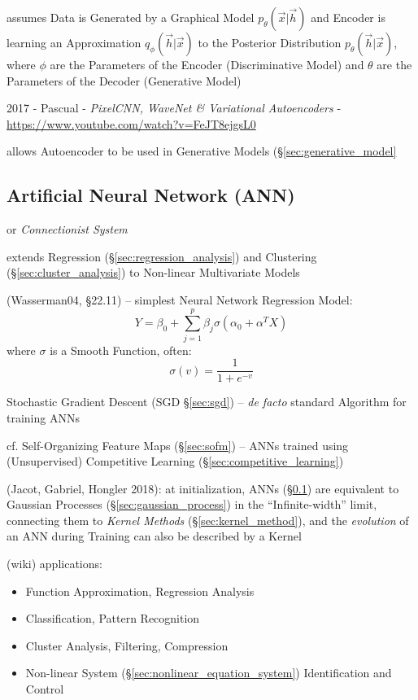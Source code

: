 assumes Data is Generated by a Graphical Model $p_\theta(\vec{x} | \vec{h})$ and
Encoder is learning an Approximation $q_\phi(\vec{h} | \vec{x})$ to the
Posterior Distribution $p_\theta(\vec{h} | \vec{x})$, where $\phi$ are the
Parameters of the Encoder (Discriminative Model) and $\theta$ are the Parameters
of the Decoder (Generative Model)

2017 - Pascual - \emph{PixelCNN, WaveNet \& Variational Autoencoders} -
\url{https://www.youtube.com/watch?v=FeJT8ejgsL0}

allows Autoencoder to be used in Generative Models (\S\ref{sec:generative_model}



\subsection{Artificial Neural Network (ANN)}\label{sec:ann}


or \emph{Connectionist System}

extends Regression (\S\ref{sec:regression_analysis}) and Clustering
(\S\ref{sec:cluster_analysis}) to Non-linear Multivariate Models

(Wasserman04, \S22.11) --
simplest Neural Network Regression Model:
\[
  Y = \beta_0 + \sum_{j=1}^p \beta_j \sigma (\alpha_0 + \alpha^T X)
\]
where $\sigma$ is a Smooth Function, often:
\[
  \sigma(v) = \frac{1}{1 + e^{-v}}
\]

Stochastic Gradient Descent (SGD \S\ref{sec:sgd}) -- \emph{de facto} standard
Algorithm for training ANNs

\fist cf. Self-Organizing Feature Maps (\S\ref{sec:sofm}) -- ANNs trained using
(Unsupervised) Competitive Learning (\S\ref{sec:competitive_learning})

(Jacot, Gabriel, Hongler 2018): at initialization, ANNs (\S\ref{sec:ann}) are
equivalent to Gaussian Processes (\S\ref{sec:gaussian_process}) in the
``Infinite-width'' limit, connecting them to \emph{Kernel Methods}
(\S\ref{sec:kernel_method}), and the \emph{evolution} of an ANN during Training
can also be described by a Kernel

(wiki) applications:
\begin{itemize}
  \item Function Approximation, Regression Analysis
  \item Classification, Pattern Recognition
  \item Cluster Analysis, Filtering, Compression
  \item Non-linear System (\S\ref{sec:nonlinear_equation_system})
    Identification and Control
\end{itemize}

